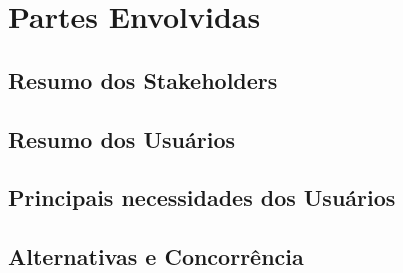 
\chapter[Partes Envolvidas]{Partes Envolvidas}

{\large {\section {Resumo dos Stakeholders}}}
{\large {\section {Resumo dos Usuários}}}
{\large {\section {Principais necessidades dos Usuários}}}
{\large {\section {Alternativas e Concorrência}}}

